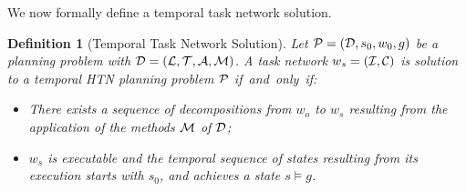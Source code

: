 \documentclass[letterpaper]{article} %
\newtheorem{definition}{Definition}
\newcommand{\name}{\text{\it name}}
\newcommand{\tstart}{\text{\it start}}
\newcommand{\tend}{\text{\it end}}
\newcommand{\task}{\text{\it task}}
\begin{document}
\begin{comment}
\begin{definition}[Decomposition]
Let $m = \bigl(\name(m),$ $\task(m), tn(m)\bigr)$ be a method with a task network $tn(m) = ({\cal{I}}^m, \alpha^m, {\cal{C}}_{o}^{m},{\cal{C}}_{d}^{m}, {\cal{C}}_{t}^{m})$ and a task network to decompose $w_1= ({\cal{I}}^1, \alpha^1, {\cal{C}}_{o}^{1},{\cal{C}}_{d}^{1}, {\cal{C}}_{t}^{1})$. We suppose ${\cal{I}}^m \cap {\cal{I}}^1 = \emptyset$. This can be achieved by renaming. Then, $m$ decomposes a task identifier $i \in {\cal{I}}^1$ into a task network $w_2= ({\cal{I}}^2, \alpha^2, {\cal{C}}_{o}^{2},{\cal{C}}_{d}^{2}, {\cal{C}}_{t}^{2})$ if and only if $\alpha^1(i) = task(m)$ and
\begin{equation*} \label{eq1}
\begin{aligned}
{\cal{I}}^2 = & ({\cal{I}}^1 - \{i\}) \cup {\cal{I}}^m\\
\alpha^2 = & (\alpha^1 \cup \alpha^m)\\
{\cal{C}}^{2}_{o} = & {\cal{C}}^{1}_{o} \cup {\cal{C}}^{m}_{o} \\
        & \cup \{ c \ | \ \forall j \in {\cal{I}}^m \ \tstart(i) \leq \tstart(j) \}  \\
        & \cup \{ c \ | \ \forall j \in {\cal{I}}^m \ \tend(i) \geq \tend(j) \}  \\
{\cal{C}}^{2}_{d}  = & {\cal{C}}^{1}_{d} \cup {\cal{C}}^{m}_{d} \\
{\cal{C}}^{2}_{t}  = & {\cal{C}}^{1}_{t} \cup {\cal{C}}^{m}_{t} \\
\end{aligned}
\end{equation*}
\end{definition}
\end{comment}

We now formally define a temporal task network solution.

\begin{definition}[Temporal Task Network Solution]
  Let ${\cal{P}} = ({\cal{D}}, s_0, w_0, g)$ be a planning problem with $\cal{D} = ({\cal{L}}, {\cal{T}}, {\cal{A}}, {\cal{M}})$. A task network $w_s = ({\cal{I}}, {\cal{C}})$ is solution to a temporal HTN planning problem ${\cal{P}}$ \mbox{if and only if:}
  \begin{itemize}
    \item There exists a sequence of decompositions from $w_o$ to $w_s$ resulting from the application of the methods ${\cal{M}}$ of ${\cal{D}}$;
\item $w_s$ is executable and the temporal sequence of states resulting from its execution starts with $s_0$, and achieves a state $s \models g$.
\end{itemize}
\end{definition}
\end{document}
